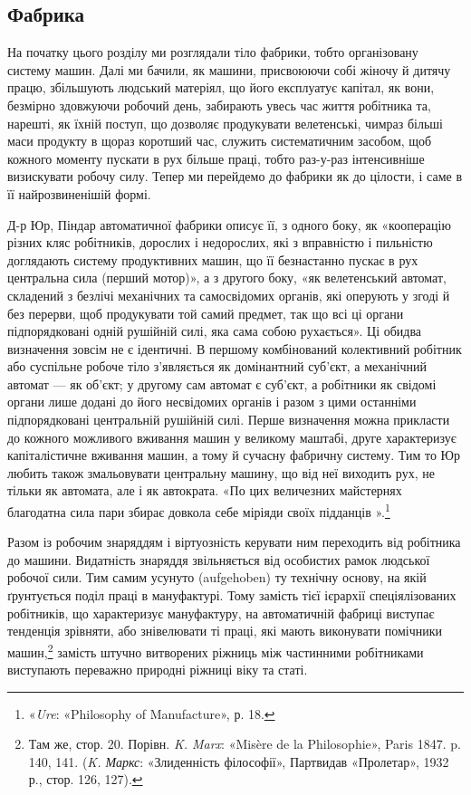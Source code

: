\subsection{Фабрика}

На початку цього розділу ми розглядали тіло фабрики, тобто
організовану систему машин. Далі ми бачили, як машини, присвоюючи
собі жіночу й дитячу працю, збільшують людський
матеріял, що його експлуатує капітал, як вони, безмірно здовжуючи
робочий день, забирають увесь час життя робітника та,
нарешті, як їхній поступ, що дозволяє продукувати велетенські,
чимраз більші маси продукту в щораз коротший час, служить
систематичним засобом, щоб кожного моменту пускати в рух
більше праці, тобто раз-у-раз інтенсивніше визискувати робочу
силу. Тепер ми перейдемо до фабрики як до цілости, і саме в її
найрозвиненішій формі.

Д-р Юр, Піндар автоматичної фабрики описує її, з одного
боку, як «кооперацію різних кляс робітників, дорослих і недорослих,
які з вправністю і пильністю доглядають систему продуктивних
машин, що її безнастанно пускає в рух центральна
сила (перший мотор)», а з другого боку, «як велетенський автомат,
складений з безлічі механічних та самосвідомих органів,
які оперують у згоді й без перерви, щоб продукувати той самий
предмет, так що всі ці органи підпорядковані одній рушійній
силі, яка сама собою рухається». Ці обидва визначення зовсім
не є ідентичні. В першому комбінований колективний робітник
або суспільне робоче тіло з’являється як домінантний суб’єкт,
а механічний автомат — як об’єкт; у другому сам автомат є
суб’єкт, а робітники як свідомі органи лише додані до його
несвідомих органів і разом з цими останніми підпорядковані
центральній рушійній силі. Перше визначення можна прикласти
до кожного можливого вживання машин у великому маштабі,
друге характеризує капіталістичне вживання машин, а тому й
сучасну фабричну систему. Тим то Юр любить також змальовувати
центральну машину, що від неї виходить рух, не тільки як
автомата, але і як автократа. «По цих величезних майстернях
благодатна сила пари збирає довкола себе міріяди своїх підданців
».\footnote{
«\emph{Ure}: «Philosophy of Manufacture», р. 18.
}

Разом із робочим знаряддям і віртуозність керувати ним
переходить від робітника до машини. Видатність знаряддя звільняється
від особистих рамок людської робочої сили. Тим самим
усунуто (aufgehoben) ту технічну основу, на якій ґрунтується
поділ праці в мануфактурі. Тому замість тієї ієрархії спеціялізованих
робітників, що характеризує мануфактуру, на автоматичній
фабриці виступає тенденція зрівняти, або знівелювати ті
праці, які мають виконувати помічники машин,\footnote{
Там же, стор. 20. Порівн. \emph{K. Marx}: «Misère de la Philosophie»,
Paris 1847. p. 140, 141. (\emph{K. Маркс}: «Злиденність філософії», Партвидав
«Пролетар», 1932 р., стор. 126, 127).
} замість штучно
витворених ріжниць між частинними робітниками виступають
переважно природні ріжниці віку та статі.

